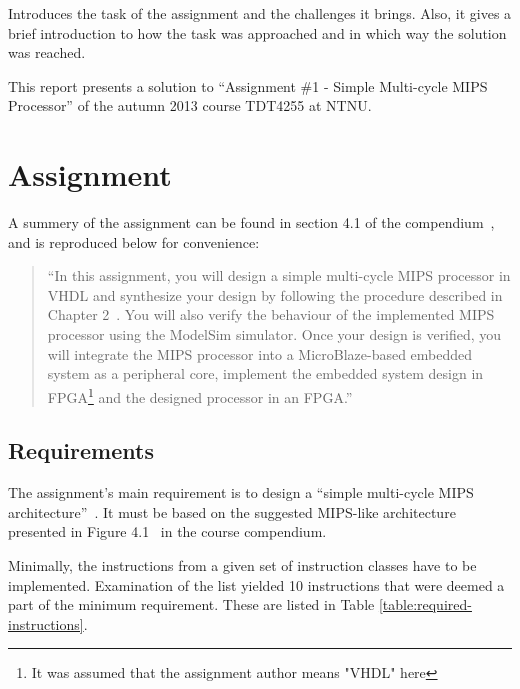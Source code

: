 Introduces the task of the assignment and the challenges it
brings.
Also, it gives a brief introduction to how the task was approached and in which way the solution was reached.


This report presents a solution to ``Assignment \#1 - Simple Multi-cycle MIPS Processor'' of the autumn 2013 course TDT4255 at NTNU.

\section{Assignment}

A summery of the assignment can be found in section 4.1 of the compendium~\cite[p.114]{compendium}, and is reproduced below for convenience:

\begin{quote}
``In this assignment, you will design a simple multi-cycle MIPS processor in VHDL and synthesize your design by following the procedure described in Chapter 2~\cite[of the compendium]{compendium}.
You will also verify the behaviour of the implemented MIPS processor using the ModelSim simulator.
Once your design is verified, you will integrate the MIPS processor into a MicroBlaze-based embedded system as a peripheral core, implement the embedded system design in FPGA\footnote{It was assumed that the assignment author means "VHDL" here} and the designed processor in an FPGA.''
\end{quote}

\subsection{Requirements}

The assignment's main requirement is to design a ``simple multi-cycle MIPS architecture''~\cite[p.114]{compendium}. It must be based on the suggested MIPS-like architecture presented in Figure 4.1~\cite[p.115]{compendium} in the course compendium.

Minimally, the instructions from a given set of instruction classes have to be implemented. 
Examination of the list yielded 10 instructions that were deemed a part of the minimum requirement.
These are listed in Table \vref{table:required-instructions}.

